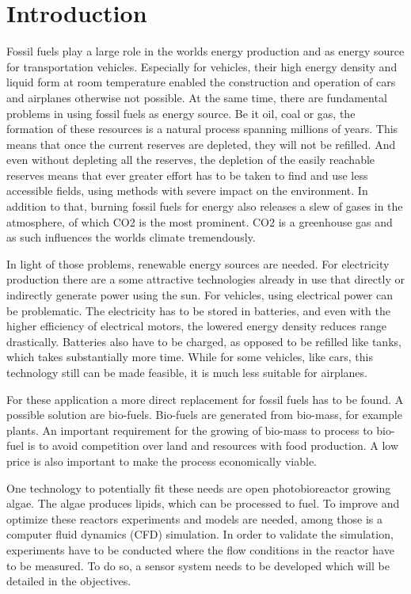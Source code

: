 \chapter{Introduction}

Fossil fuels play a large role in the worlds energy production and as energy source for transportation vehicles. Especially for vehicles, their high energy density and liquid form at room temperature enabled the construction and operation of cars and airplanes otherwise not possible.
At the same time, there are fundamental problems in using fossil fuels as energy source. Be it oil, coal or gas, the formation of these resources is a natural process spanning millions of years. This means that once the current reserves are depleted, they will not be refilled. And even without depleting all the reserves, the depletion of the easily reachable reserves means that ever greater effort has to be taken to find and use less accessible fields, using methods with severe impact on the environment.
In addition to that, burning fossil fuels for energy also releases a slew of gases in the atmosphere, of which CO2 is the most prominent. CO2 is a greenhouse gas and as such influences the worlds climate tremendously.

In light of those problems, renewable energy sources are needed. For electricity production there are a some attractive technologies already in use that directly or indirectly generate power using the sun. For vehicles, using electrical power can be problematic. The electricity has to be stored in batteries, and even with the higher efficiency of electrical motors, the lowered energy density reduces range drastically. Batteries also have to be charged, as opposed to be refilled like tanks, which takes substantially more time. While for some vehicles, like cars, this technology still can be made feasible, it is much less suitable for airplanes.

For these application a more direct replacement for fossil fuels has to be found. A possible solution are bio-fuels. Bio-fuels are generated from bio-mass, for example plants. An important requirement for the growing of bio-mass to process to bio-fuel is to avoid competition over land and resources with food production. A low price is also important to make the process economically viable.

One technology to potentially fit these needs are open photobioreactor growing algae. The algae produces lipids, which can be processed to fuel. To improve and optimize these reactors experiments and models are needed, among those is a computer fluid dynamics (CFD) simulation. In order to validate the simulation, experiments have to be conducted where the flow conditions in the reactor have to be measured. To do so, a sensor system needs to be developed which will be detailed in the objectives.